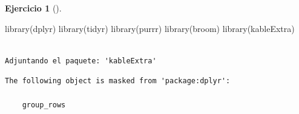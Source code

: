 \documentclass[
  a4paper,
]{scrreport}
\newenvironment{Shaded}{\begin{snugshade}}{\end{snugshade}}
\newcommand{\FunctionTok}[1]{\textcolor[rgb]{0.28,0.35,0.67}{#1}}
\newcommand{\NormalTok}[1]{\textcolor[rgb]{0.00,0.23,0.31}{#1}}
\theoremstyle{definition}
\newtheorem{exercise}{Ejercicio}[chapter]
\theoremstyle{remark}
\begin{document}
\begin{exercise}[]
\begin{enumerate}
\begin{tcolorbox}
\begin{Shaded}
\begin{Highlighting}[]
\FunctionTok{library}\NormalTok{(dplyr)}
\FunctionTok{library}\NormalTok{(tidyr)}
\FunctionTok{library}\NormalTok{(purrr)}
\FunctionTok{library}\NormalTok{(broom)}
\FunctionTok{library}\NormalTok{(kableExtra)}
\end{Highlighting}
\end{Shaded}

\begin{verbatim}

Adjuntando el paquete: 'kableExtra'
\end{verbatim}

\begin{verbatim}
The following object is masked from 'package:dplyr':

    group_rows
\end{verbatim}


\end{tcolorbox}
\end{enumerate}
\end{exercise}
\end{document}

